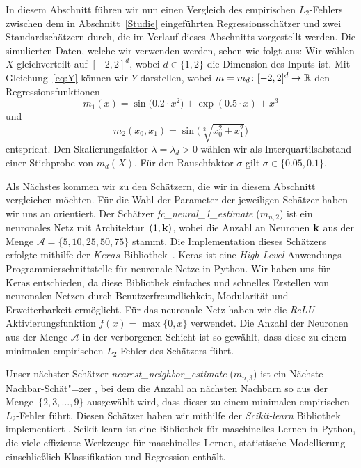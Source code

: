 In diesem Abschnitt führen wir nun einen Vergleich des empirischen $L_2$-Fehlers zwischen dem in Abschnitt~\ref{Studie} eingeführten Regressionsschätzer und zwei Standardschätzern durch, die im Verlauf dieses Abschnitts vorgestellt werden.
Die simulierten Daten, welche wir verwenden werden, sehen wie folgt aus:
Wir wählen $X$ gleichverteilt auf $[-2, 2]^d$, wobei $d \in \{1,2\}$ die Dimension des Inputs ist. Mit Gleichung~\eqref{eq:Y} können wir $Y$ darstellen, wobei $m = m_d \colon [-2, 2]^d \to \mathbb{R}$ den Regressionsfunktionen
$$ m_1(x) =  \sin\big(0.2 \cdot x^2\big) + \exp(0.5 \cdot x) + x^3$$
und
$$ m_2(x_0, x_1) = \sin\big(\sqrt[2]{x_0^2 + x_1^2}\big)$$
entspricht. 
Den Skalierungsfaktor $\lambda = \lambda_d > 0$ wählen wir als Interquartilsabstand einer Stichprobe von $m_d(X)$. Für den Rauschfaktor $\sigma$ gilt $\sigma \in \{0.05, 0.1\}.$

Als Nächstes kommen wir zu den Schätzern, die wir in diesem Abschnitt vergleichen möchten. Für die Wahl der Parameter der jeweiligen Schätzer haben wir uns an \cite{kohler19} orientiert.
Der Schätzer \textit{fc\_neural\_1\_estimate} ($m_{n,2}$) ist ein neuronales Netz mit Architektur~$(1,\mathbf{k})$, wobei die Anzahl an Neuronen $\mathbf{k}$ aus der Menge $\mathcal{A} = \{5, 10, 25, 50, 75\}$ stammt. Die Implementation dieses Schätzers erfolgte mithilfe der $Keras$ Bibliothek~\cite{chollet2015keras}. Keras ist eine \emph{High-Level} Anwendungs-Programmierschnittstelle für neuronale Netze in Python. Wir haben uns für Keras entschieden, da diese Bibliothek einfaches und schnelles Erstellen von neuronalen Netzen durch Benutzerfreundlichkeit, Modularität und Erweiterbarkeit ermöglicht. Für das neuronale Netz haben wir die \emph{ReLU} Aktivierungsfunktion $f(x) = \max\{0,x\}$ verwendet. Die Anzahl der Neuronen aus der Menge $\mathcal{A}$ in der verborgenen Schicht ist so gewählt, dass diese zu einem minimalen empirischen $L_2$-Fehler des Schätzers führt.

Unser nächster Schätzer \textit{nearest\_neighbor\_estimate} ($m_{n,3}$) ist ein Nächste-Nachbar-Schät"=zer \cite[Kapitel~7.1]{fahrmeir2009regression}, bei dem die Anzahl an nächsten Nachbarn so aus der Menge~$\{ 2,3,\dots,9\}$ ausgewählt wird, dass dieser zu einem minimalen empirischen $L_2$-Fehler führt. Diesen Schätzer haben wir mithilfe der \emph{Scikit-learn} Bibliothek implementiert \cite{scikit-learn}. Scikit-learn ist eine Bibliothek für maschinelles Lernen in Python, die viele effiziente Werkzeuge für maschinelles Lernen, statistische Modellierung einschließlich Klassifikation und Regression enthält.

